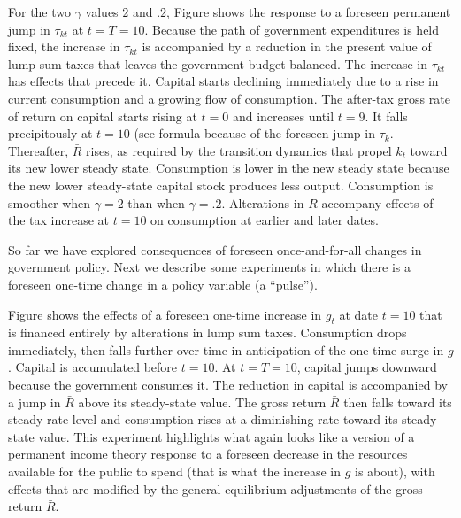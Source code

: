 \medskip
{} For the two $\gamma$ values $2$ and $.2$, Figure
 shows the response to a foreseen permanent jump
in $\tau_{kt}$ at $t=T=10$. Because the  path of government
expenditures is held fixed, the increase in $\tau_{kt}$ is
accompanied by a reduction in the present value of lump-sum taxes
that leaves the government budget balanced.  The increase in
$\tau_{kt}$ has effects that precede it.  Capital starts declining
immediately due to a rise in current consumption and a
growing flow of consumption. The after-tax gross rate of return on
capital starts rising at   $t=0$ and increases until $t=9$. It
falls precipitously at $t=10$ (see formula  because
of the foreseen jump in $\tau_k$. Thereafter, $\bar R$ rises, as
required by the transition dynamics that propel $k_t$ toward its
new lower steady state. Consumption is lower in the new steady
state because the new lower steady-state capital stock produces
less output.  Consumption is smoother when $\gamma =2$ than when $\gamma=.2$.  Alterations in $\bar R$ accompany  effects of the tax increase at $t=10$
on  consumption at earlier and later dates.


\medskip
So far we have explored consequences of foreseen once-and-for-all
changes in government policy.  Next we describe some experiments
in which there is a foreseen one-time  change in a policy variable
(a ``pulse'').
\medskip

\medskip
{}  Figure 
shows the effects of a foreseen one-time increase in $g_t$ at
date $t=10$ that is financed entirely by alterations in lump sum
taxes.  Consumption drops immediately, then falls further over
time in anticipation of the one-time surge in $g$.  Capital is
accumulated before $t=10$. At $t=T=10$, capital jumps downward because the
government consumes it.  The reduction in capital is accompanied
by a jump in  $\bar R$ above its steady-state value.
The gross return $\bar R$ then falls toward its steady rate level and
consumption rises at a diminishing
rate toward its steady-state value. %
  This experiment
highlights what again looks like a  version of a permanent income theory
response to a foreseen decrease in the resources
available for the public to spend (that is what the increase in
$g$ is about), with effects that are modified by the general
equilibrium adjustments of the gross return $\bar R$.



